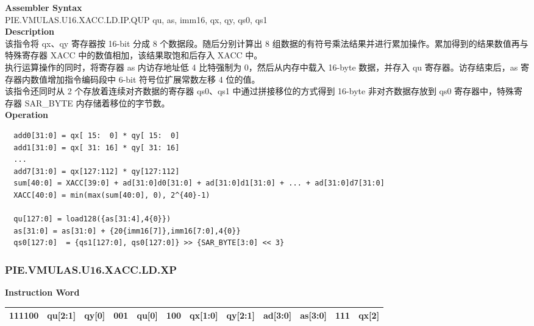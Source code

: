 \textbf{Assembler Syntax} \\
PIE.VMULAS.U16.XACC.LD.IP.QUP qu, as, imm16, qx, qy, qs0, qs1 \\
\textbf{Description} \\
该指令将 qx、qy 寄存器按 16-bit 分成 8 个数据段。随后分别计算出 8 组数据的有符号乘法结果并进行累加操作。累加得到的结果数值再与特殊寄存器 XACC 中的数值相加，该结果取饱和后存入 XACC 中。\\
执行运算操作的同时，将寄存器 as 内访存地址低 4 比特强制为 0，然后从内存中载入 16-byte 数据，并存入 qu 寄存器。访存结束后，as 寄存器内数值增加指令编码段中 6-bit 符号位扩展常数左移 4 位的值。\\
该指令还同时从 2 个存放着连续对齐数据的寄存器 qs0、qs1 中通过拼接移位的方式得到 16-byte 非对齐数据存放到 qs0 寄存器中，特殊寄存器 SAR\_BYTE 内存储着移位的字节数。\\
\textbf{Operation}
\begin{lstlisting}
  add0[31:0] = qx[ 15:  0] * qy[ 15:  0]
  add1[31:0] = qx[ 31: 16] * qy[ 31: 16]
  ...
  add7[31:0] = qx[127:112] * qy[127:112]
  sum[40:0] = XACC[39:0] + ad[31:0]d0[31:0] + ad[31:0]d1[31:0] + ... + ad[31:0]d7[31:0]
  XACC[40:0] = min(max(sum[40:0], 0), 2^{40}-1)

  qu[127:0] = load128({as[31:4],4{0}})
  as[31:0] = as[31:0] + {20{imm16[7]},imm16[7:0],4{0}}
  qs0[127:0]  = {qs1[127:0], qs0[127:0]} >> {SAR_BYTE[3:0] << 3}
\end{lstlisting}

\newpage
\subsubsection{PIE.VMULAS.U16.XACC.LD.XP}\label{instruction:PIEVMULASU16XACCLDXP}
\setlength\tabcolsep{6pt}
\textbf{Instruction Word} \\
\begin{tabular}{|c|c|c|c|c|c|c|c|c|c|c|c|}
	\hline
	111100 & qu[2:1] & qy[0] & 001 & qu[0] & 100 & qx[1:0] & qy[2:1] & ad[3:0] & as[3:0] & 111 & qx[2] \\
	\hline
\end{tabular}

